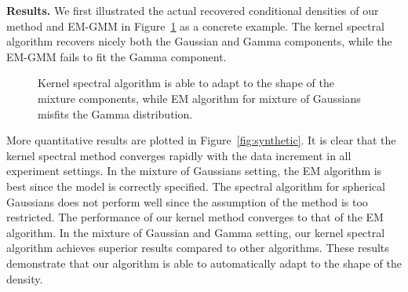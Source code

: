 \documentclass{article}
\begin{document}
{\bf Results.} We first illustrated the actual recovered conditional densities of our method and EM-GMM in Figure~\ref{fig:shape} as a concrete example. The kernel spectral algorithm recovers nicely both the Gaussian and Gamma components, while the EM-GMM fails to fit the Gamma component.

\begin{figure}[t]
	\vspace{-3mm}
	\vspace{-4mm}
  \caption{Kernel spectral algorithm is able to adapt to the shape of the mixture components, while EM algorithm for mixture of Gaussians misfits the Gamma distribution.}\label{fig:shape}
	\vspace{-3mm}
\end{figure}

More quantitative results are plotted in Figure~\ref{fig:synthetic}. It is clear that the kernel spectral method converges rapidly with the data increment in all experiment settings. In the mixture of Gaussians setting, the EM algorithm is best since the model is correctly specified. The spectral algorithm for spherical Gaussians does not perform well since the assumption of the method is too restricted. The performance of our kernel method converges to that of the EM algorithm. In the mixture of Gaussian and Gamma setting, our kernel spectral algorithm achieves superior results compared to other algorithms. These results demonstrate that our algorithm is able to automatically adapt to the shape of the density.
\end{document}
